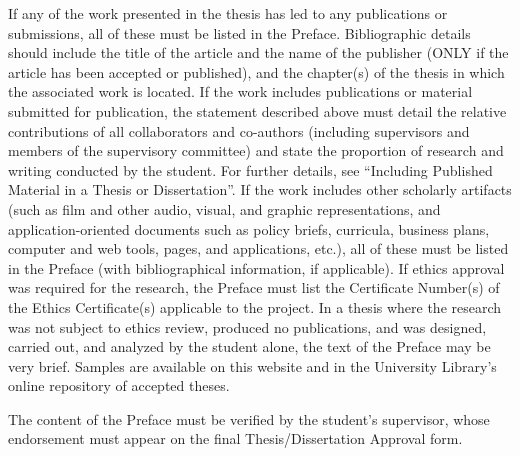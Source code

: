 If any of the work presented in the thesis has led to any publications or submissions, all of these must be listed in the Preface. 
Bibliographic details should include the title of the article and the name of the publisher (ONLY if the article has been accepted or published), and the chapter(s) of the thesis in which the associated work is located.
If the work includes publications or material submitted for publication, the statement described above must detail the relative contributions of all collaborators and co-authors (including supervisors and members of the supervisory committee) and state the proportion of research and writing conducted by the student. For further details, see “Including Published Material in a Thesis or Dissertation”.
If the work includes other scholarly artifacts (such as film and other audio, visual, and graphic representations, and application-oriented documents such as policy briefs, curricula, business plans, computer and web tools, pages, and applications, etc.), all of these must be listed in the Preface (with bibliographical information, if applicable).
If ethics approval was required for the research, the Preface must list the Certificate Number(s) of the Ethics Certificate(s) applicable to the project.
In a thesis where the research was not subject to ethics review, produced no publications, and was designed, carried out, and analyzed by the student alone, the text of the Preface may be very brief. Samples are available on this website and in the University Library's online repository of accepted theses.

The content of the Preface must be verified by the student's supervisor, whose endorsement must appear on the final Thesis/Dissertation Approval form.